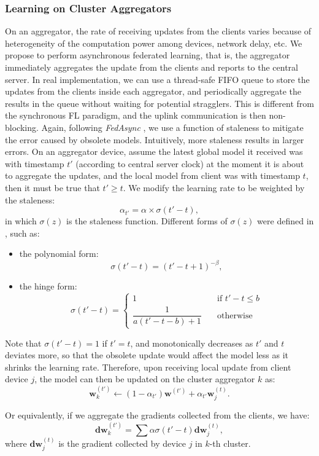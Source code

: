 \documentclass[10pt,twocolumn,letterpaper]{article}
\theoremstyle{definition}
\begin{document}
\subsubsection{Learning on Cluster Aggregators}
On an aggregator, the rate of receiving updates from the clients varies because of heterogeneity of the computation power among devices, network delay, etc. We propose to perform asynchronous federated learning, that is, the aggregator immediately aggregates the update from the clients and reports to the central server. In real implementation, we can use a thread-safe FIFO queue to store the updates from the clients inside each aggregator, and periodically aggregate the results in the queue without waiting for potential stragglers. This is different from the synchronous FL paradigm, and the uplink communication is then non-blocking. Again, following \textit{FedAsync} \cite{xie2019asynchronous}, we use a function of staleness to mitigate the error caused by obsolete models. Intuitively, more staleness results in larger errors. On an aggregator device, assume the latest global model it received was with timestamp $t'$ (according to central server clock) at the moment it is about to aggregate the updates,
and the local model from client was with timestamp $t$, then it must be true that $t' \ge t$. We modify the learning rate to be weighted by the staleness:
\[ \alpha_{t'} = \alpha \times \sigma(t'-t), \]
in which $\sigma(z)$ is the staleness function. Different forms of $\sigma(z)$ were defined in \cite{xie2019asynchronous}, such as:
\begin{itemize}
    \item the polynomial form: \[ \sigma (t'-t) = (t'-t+1)^{-\beta} , \]
    \item the hinge form: \[ \sigma (t'-t) = \begin{cases}
    1      & \quad \text{if } t'-t \le b \\
    \dfrac{1}{a(t'-t-b)+1}  & \quad \text{otherwise}
  \end{cases} \]
\end{itemize}
Note that $\sigma(t'-t)=1$ if $t'=t$, and monotonically decreases as $t'$ and $t$ deviates more, so that the obsolete update would affect the model less as it shrinks the learning rate. 
Therefore, upon receiving local update from client device $j$, the model can then be updated on the cluster aggregator $k$ as:
\[ \mathbf{w}_k^{(t')} \leftarrow (1-\alpha_{t'}) \mathbf{w}^{(t')} + \alpha_{t'} \mathbf{w}^{(t)}_{j}. \]

Or equivalently, if we aggregate the gradients collected from the clients, we have:
\[ \mathbf{dw}_k^{(t')} = \sum \alpha \sigma(t'-t) \mathbf{dw}_j^{(t)}, \]
where $\mathbf{dw}_j^{(t)} $ is the gradient collected by device $j$ in $k$-th cluster. 
\end{document}

